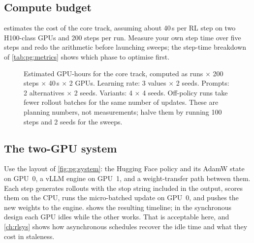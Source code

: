 \subsection{Compute budget}

 estimates the cost of the core track, assuming about 40\,s per RL step on
two H100-class GPUs and 200 steps per run. Measure your own step time over five steps and redo the
arithmetic before launching sweeps; the step-time breakdown of \cref{tab:pg:metrics} shows which
phase to optimise first.

\begin{figure}[ht]
\centering
{}
\caption{Estimated GPU-hours for the core track, computed as runs $\times$ 200 steps $\times$ 40\,s $\times$ 2 GPUs.
Learning rate: 3 values $\times$ 2 seeds. Prompts: 2 alternatives $\times$ 2 seeds. Variants: 4 $\times$ 4 seeds.
Off-policy runs take fewer rollout batches for the same number of updates. These are planning
numbers, not measurements; halve them by running 100 steps and 2 seeds for the sweeps.}
\label{fig:proj5:budget}
\end{figure}

\subsection{The two-GPU system}

Use the layout of \cref{fig:pg:system}: the Hugging Face policy and its AdamW state on GPU~0, a vLLM
engine on GPU~1, and a weight-transfer path between them. Each step generates rollouts with the
stop string included in the output, scores them on the CPU, runs the micro-batched update on
GPU~0, and pushes the new weights to the engine.  shows the resulting
timeline; in the synchronous design each GPU idles while the other works. That is acceptable here,
and \cref{ch:rlsys} shows how asynchronous schedules recover the idle time and what they cost in
staleness.

